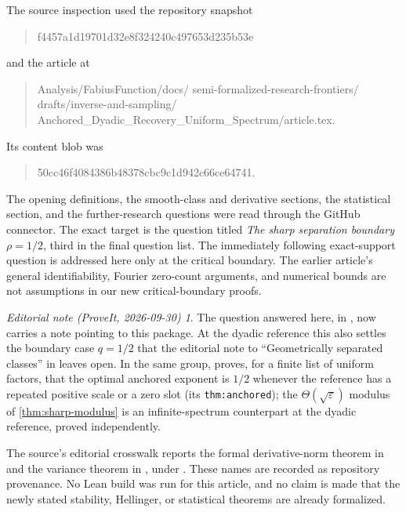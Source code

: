 \documentclass[11pt,a4paper]{article}
\numberwithin{equation}{section}
\theoremstyle{definition}
\theoremstyle{remark}
\newtheorem*{ednote}{Editorial note (ProveIt, 2026-09-30)}
\newcommand{\eps}{\varepsilon}
\newcommand{\repoSHA}{f4457a1d19701d32e8f324240c497653d235b53e}
\newcommand{\blobSHA}{50cc46f4084386b48378cbc9c1d942c66ce64741}
\begin{document}
The source inspection used the repository snapshot
\begin{quote}\small\ttfamily\raggedright\repoSHA\end{quote}
and the article at
\begin{quote}\small\ttfamily\raggedright
Analysis/FabiusFunction/docs/\allowbreak
semi-formalized-research-frontiers/\allowbreak
drafts/inverse-and-sampling/\allowbreak
Anchored\_Dyadic\_Recovery\_Uniform\_Spectrum/\allowbreak article.tex.
\end{quote}
Its content blob was
\begin{quote}\small\ttfamily\raggedright\blobSHA.\end{quote}
The opening definitions, the smooth-class and derivative sections, the
statistical section, and the further-research questions were read through
the GitHub connector. The exact target is the question titled
\emph{The sharp separation boundary $\rho=1/2$}, third in the final question
list. The immediately following exact-support question is addressed here
only at the critical boundary. The earlier article's general identifiability,
Fourier zero-count arguments, and numerical bounds are not assumptions in
our new critical-boundary proofs.
\begin{ednote}
The question answered here,
in , now carries a
note pointing to this package. At the dyadic reference this also settles
the boundary case $q=1/2$ that the editorial note to ``Geometrically
separated classes'' in 
leaves open. In the same group,
 proves, for
a finite list of uniform factors, that the optimal anchored exponent is
$1/2$ whenever the reference has a repeated positive scale or a zero slot
(its \texttt{thm:anchored}); the $\Theta(\sqrt\eps)$ modulus of
\cref{thm:sharp-modulus} is an infinite-spectrum counterpart at the dyadic
reference, proved independently.
\end{ednote}

The source's editorial crosswalk reports the formal derivative-norm theorem
 in
 and the variance theorem
 in
, under
.
These names are recorded as repository provenance. No Lean build was run for
this article, and no claim is made that the newly stated stability,
Hellinger, or statistical theorems are already formalized.
\end{document}
